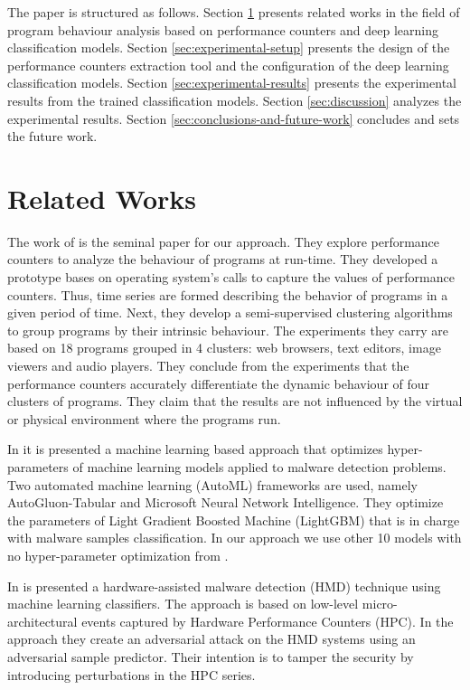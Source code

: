 \documentclass[conference]{IEEEtran}
\begin{document}
The paper is structured as follows.
Section \ref{sec:related-works} presents related works in the field of program behaviour analysis 
based on performance counters and deep learning classification models.
Section \ref{sec:experimental-setup} presents the design of the performance counters extraction tool 
and the configuration of the deep learning classification models.
Section \ref{sec:experimental-results} presents the experimental results from the trained 
classification models.
Section \ref{sec:discussion} analyzes the experimental results. 
Section \ref{sec:conclusions-and-future-work} concludes and sets the future work.

\section{Related Works}
\label{sec:related-works}
The work of \cite{Kadiyala2021} is the seminal paper for our approach. They explore performance counters to analyze the behaviour of programs at run-time. They developed a prototype bases on operating system's calls to capture the values of performance counters. Thus, time series are formed describing the behavior of programs in a given period of time. Next, they develop a semi-supervised clustering algorithms to group programs by their intrinsic behaviour. The experiments they carry are based on 18 programs grouped in 4 clusters: web browsers, text editors, image viewers and audio players. They conclude from the experiments that the performance counters accurately differentiate the dynamic behaviour of four clusters of programs. They claim that the results are not influenced by the virtual or physical environment where the programs run.

In \cite{Kundu2021} it is presented a machine learning based approach that optimizes hyper-parameters of machine learning models applied to malware detection problems. Two automated machine learning (AutoML) frameworks are used, namely AutoGluon-Tabular and Microsoft Neural Network Intelligence. They optimize the parameters of Light Gradient Boosted Machine (LightGBM) that is in charge with malware samples classification. In our approach we use other 10 models with no hyper-parameter optimization from \cite{Fawaz2019}.

In \cite{Dinakarrao2019} is presented a hardware-assisted malware detection (HMD) technique using machine learning classifiers. The approach is based on low-level micro-architectural events captured by Hardware Performance Counters (HPC). In the approach they create an adversarial attack on the HMD systems using an adversarial sample predictor. Their intention is to tamper the security by introducing perturbations in the HPC series.
\end{document}
